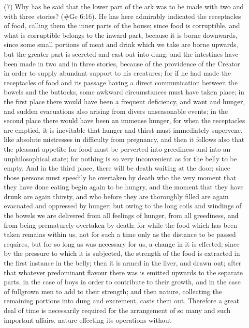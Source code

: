 (7) Why has he said that the lower part of the ark was to be made with two and with three stories?
(\#Ge 6:16). He has here admirably indicated the receptacles of food, calling them the inner
parts of the house; since food is corruptible, and what is corruptible belongs to the inward part,
because it is borne downwards, since some small portions of meat and drink which we take are
borne upwards, but the greater part is secreted and cast out into dung; and the intestines have
been made in two and in three stories, because of the providence of the Creator in order to supply
abundant support to his creatures; for if he had made the receptacles of food and its passage
having a direct communication between the bowels and the buttocks, some awkward
circumstances must have taken place; in the first place there would have been a frequent
deficiency, and want and hunger, and sudden evacuations also arising from divers unseasonable
events; in the second place there would have been an immense hunger, for when the receptacles
are emptied, it is inevitable that hunger and thirst must immediately supervene, like absolute
mistresses in difficulty from pregnancy, and then it follows also that the pleasant appetite for food
must be perverted into greediness and into an unphilosophical state; for nothing is so very
inconvenient as for the belly to be empty. And in the third place, there will be death waiting at the
door; since those persons must speedily be overtaken by death who the very moment that they
have done eating begin again to be hungry, and the moment that they have drunk are again thirsty,
and who before they are thoroughly filled are again evacuated and oppressed by hunger; but owing
to the long coils and windings of the bowels we are delivered from all feelings of hunger, from all
greediness, and from being prematurely overtaken by death; for while the food which has been
taken remains within us, not for such a time only as the distance to be passed requires, but for so
long as was necessary for us, a change in it is effected; since by the pressure to which it is
subjected, the strength of the food is extracted in the first instance in the belly; then it is armed in
the liver, and drawn out; after that whatever predominant flavour there was is emitted upwards to
the separate parts, in the case of boys in order to contribute to their growth, and in the case of
fullgrown men to add to their strength; and then nature, collecting the remaining portions into dung
and excrement, casts them out. Therefore a great deal of time is necessarily required for the
arrangement of so many and such important affairs, nature effecting its operations without
